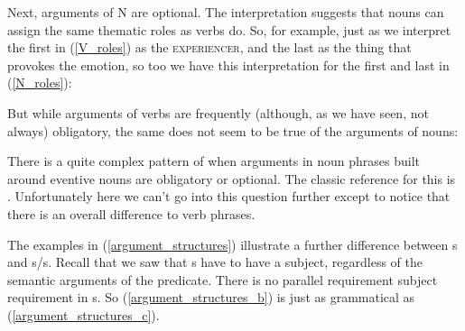 \documentclass{article}
\begin{document}
Next, arguments of N are optional.
The interpretation suggests that nouns can assign the same thematic roles as verbs do.
So, for example, just as we interpret the first  in (\ref{V_roles}) as the \textsc{experiencer}, and the last  as the thing that provokes the emotion, so too we have this interpretation for the first and last  in (\ref{N_roles}):
\begin{exe}
\end{exe}
But while arguments of verbs are frequently (although, as we have seen, not always) obligatory, the same does not seem to be true of the arguments of nouns:
\begin{exe}
\begin{multicols}{2}
    \label{argument_structures}
    \end{multicols}
\end{exe}
There is a quite complex pattern of when arguments in noun phrases built around eventive nouns are obligatory or optional.
The classic reference for this is \citet{grimshaw_argument_1990}.
Unfortunately here we can't go into this question further except to notice that there is an overall difference to verb phrases.

The examples in (\ref{argument_structures}) illustrate a further difference between s and s/s.
Recall that we saw that s have to have a subject, regardless of the semantic arguments of the predicate.
There is no parallel requirement subject requirement in s.
So (\ref{argument_structures_b}) is just as grammatical as (\ref{argument_structures_c}).  
\end{document}
